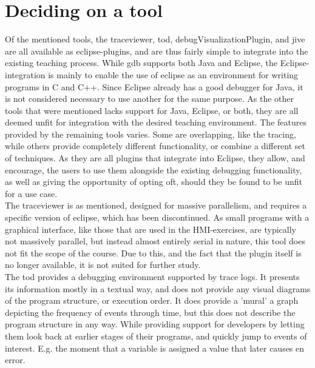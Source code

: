 \section{Deciding on a tool}\label{preDiscuss}
Of the mentioned tools, the \gls{traceviewer}, \gls{tod}, \gls{debugVisualizationPlugin}, and \gls{jive} are all available as eclipse-plugins, and are thus fairly simple to integrate into the existing teaching process.
While \gls{gdb} supports both Java and Eclipse, the Eclipse-integration is mainly to enable the use of eclipse as an environment for writing programs in C and C++.
Since Eclipse already has a good debugger for Java, it is not considered necessary to use another for the same purpose.
As the other tools that were mentioned lacks support for Java, Eclipse, or both, they are all deemed unfit for integration with the desired teaching environment.
The features provided by the remaining tools varies.
Some are overlapping, like the tracing, while others provide completely different functionality, or combine a different set of techniques.
As they are all plugins that integrate into Eclipse, they allow, and encourage, the users to use them alongside the existing debugging functionality, as well as giving the opportunity of opting oft, should they be found to be unfit for a use case.
~\\

The \gls{traceviewer} is as mentioned, designed for massive parallelism, and requires a specific version of eclipse, which has been discontinued.
As small programs with a graphical interface, like those that are used in the HMI-exercises, are typically not massively parallel, but instead almost entirely serial in nature, this tool does not fit the scope of the course.
Due to this, and the fact that the plugin itself is no longer available, it is not suited for further study.
~\\

The \gls{tod} provides a debugging environment supported by trace logs.
It presents its information mostly in a textual way, and does not provide any visual diagrams of the program structure, or execution order.
It does provide a 'mural' a graph depicting the frequency of events through time, but this does not describe the program structure in any way.
While providing support for developers by letting them look back at earlier stages of their programs, and quickly jump to events of interest.
E.g. the moment that a variable is assigned a value that later causes en error.
~\\

